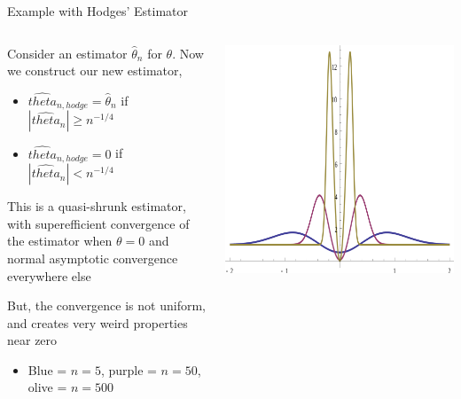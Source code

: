 \documentclass[notes,11pt, aspectratio=169]{beamer}
\newenvironment{wideitemize}{\itemize\addtolength{\itemsep}{10pt}}{\enditemize}
\begin{document}
\begin{frame}{Example with Hodges' Estimator}
  \begin{columns}[T] %
    \begin{column}{.6\textwidth}
      \begin{wideitemize}
      \item Consider an estimator $\hat{\theta}_{n}$ for $\theta$. Now we construct our new estimator,
        \begin{itemize}
        \item $\hat{theta}_{n,hodge} = \hat{\theta}_{n}$ if $|\hat{theta}_{n}|  \geq n^{-1/4}$
        \item $\hat{theta}_{n,hodge} = 0$ if $|\hat{theta}_{n}|  < n^{-1/4}$          
        \end{itemize}
      \item This is a quasi-shrunk estimator, with superefficient
        convergence of the estimator when $\theta = 0$ and normal
        asymptotic convergence everywhere else
      \item But, the convergence is not uniform, and creates very weird properties near zero
        \begin{itemize}
        \item Blue = $n=5$, purple = $n=50$, olive = $n=500$
        \end{itemize}
      \end{wideitemize}
    \end{column}%
  \hfill%
  \begin{column}{.4\textwidth}
    \includegraphics[width=\linewidth]{hodges.png}
  \end{column}
\end{columns}
\end{frame}
\end{document}
